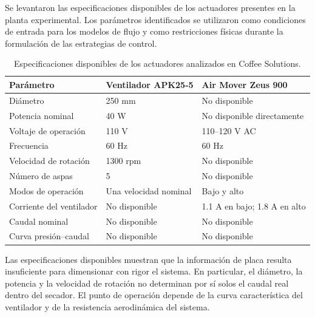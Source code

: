 Se levantaron las especificaciones disponibles de los actuadores presentes en la planta experimental. Los parámetros identificados se utilizaron como condiciones de entrada para los modelos de flujo y como restricciones físicas durante la formulación de las estrategias de control.

\begin{table}[H]
\centering
\caption{Especificaciones disponibles de los actuadores analizados en Coffee Solutions.}
\label{tab:actuadores_coffee_solutions}
\renewcommand{\arraystretch}{1.3}
\begin{tabular}{
p{}
p{}
p{}
}
\toprule
\textbf{Parámetro}
&
\textbf{Ventilador APK25-5}
&
\textbf{Air Mover Zeus 900}
\\
\midrule

Diámetro
&
250 mm
&
No disponible
\\

Potencia nominal
&
40 W
&
No disponible directamente
\\

Voltaje de operación
&
110 V
&
110--120 V AC
\\

Frecuencia
&
60 Hz
&
60 Hz
\\

Velocidad de rotación
&
1300 rpm
&
No disponible
\\

Número de aspas
&
5
&
No disponible
\\

Modos de operación
&
Una velocidad nominal
&
Bajo y alto
\\

Corriente del ventilador
&
No disponible
&
1.1 A en bajo; 1.8 A en alto
\\

Caudal nominal
&
No disponible
&
No disponible
\\

Curva presión--caudal
&
No disponible
&
No disponible
\\
\bottomrule
\end{tabular}
\end{table}

Las especificaciones disponibles muestran que la información de placa resulta insuficiente para dimensionar con rigor el sistema. En particular, el diámetro, la potencia y la velocidad de rotación no determinan por sí solos el caudal real dentro del secador. El punto de operación depende de la curva característica del ventilador y de la resistencia aerodinámica del sistema.

